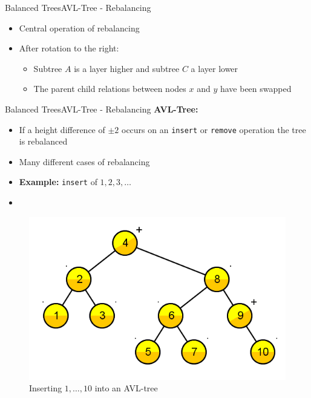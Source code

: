 \begin{frame}{Balanced Trees}{AVL-Tree - Rebalancing}
\begin{itemize}
    \item<2->
      Central operation of {\color{Mittel-Blau}rebalancing}
    \item<3->
      After rotation to the right:
      \begin{itemize}
        \item<4->
          Subtree {\color{Mittel-Blau}$A$} is a layer higher and subtree
          {\color{Mittel-Blau}$C$} a layer lower
        \item<5->
          The parent child relations between nodes {\color{Mittel-Blau}$x$} and
          {\color{Mittel-Blau}$y$} have been swapped
      \end{itemize}
  \end{itemize}
\end{frame}


\begin{frame}{Balanced Trees}{AVL-Tree - Rebalancing}
  \textbf{AVL-Tree:}
  \begin{itemize}
    \item<2->
      If a height difference of $\pm 2$ occurs on an
      \texttt{\color{Mittel-Blau}insert} or
      \texttt{\color{Mittel-Blau}remove} operation the tree is rebalanced
    \item<3->
      Many different cases of rebalancing
    \item<4->
      \textbf{Example:}
      \texttt{\color{Mittel-Blau}insert} of $1,2,3,\dotsc$
    \item<5-> \href{http://people.ksp.sk/~kuko/bak}{}
  \end{itemize}
  \begin{figure}
    \includegraphics[width=0.5\linewidth]
      {Images/AVL-Tree/AVL-Tree_Insert1To10.png}
    \caption{Inserting $1,\dots,10$ into an AVL-tree~\cite{gnarley_trees}}
    \label{fig:balanced_trees:avl_tree_example4}
  \end{figure}
\end{frame}

